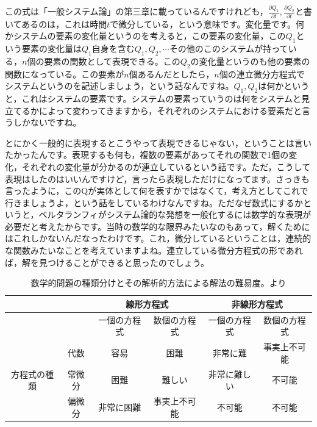 \documentclass{ltjsbook}
\begin{document}
この式は「一般システム論」\parencite{vonBertalanffy}の第三章に載っているんですけれども，$\frac{\partial Q_1}{\partial t},\frac{\partial Q_2}{\partial t}$と書いてあるのは，これは時間$t$で微分している，という意味です。変化量です。何かシステムの要素の変化量というのを考えると，この要素の変化量，この$Q_1$という要素の変化量は$Q_1$自身を含む$Q_1,Q_2,\cdots$その他のこのシステムが持っている，$n$個の要素の関数として表現できる。この$Q_2$の変化量というのも他の要素の関数になっている。この要素が$n$個あるんだとしたら，$n$個の連立微分方程式でシステムというのを記述しましょう，という話なんですね。$Q_1,Q_2$は何かというと，これはシステムの要素です。システムの要素っていうのは何をシステムと見立てるかによって変わってきますから，それぞれのシステムにおける要素だと言うしかないですね。

とにかく一般的に表現するとこうやって表現できるじゃない，ということは言いたかったんです。表現するも何も，複数の要素があってそれの関数で1個の変化，それぞれの変化量が分かるのが連立しているという話です。ただ，こうして表現はしたのはいいんですけど，言ったら表現しただけになってます。さっきも言ったように，このQが実体として何を表すかではなくて，考え方としてこれで行きましょうよ，という話をしているわけなんですね。ただなぜ数式にするかというと，ベルタランフィがシステム論的な発想を一般化するには数学的な表現が必要だと考えたからです。当時の数学的な限界みたいなのもあって，解くためにはこれしかないんだなったわけです。これ，微分しているということは，連続的な関数みたいなことを考えていますよね。連立している微分方程式の形であれば，解を見つけることができると思ったのでしょう。

\begin{table}[h!]
    \centering
    \caption{数学的問題の種類分けとその解析的方法による解法の難易度。\textcite{vonBertalanffy}より}
    \begin{tabular}{|c|c|c|c|c|c|}
        \hline
        & & \multicolumn{2}{c|}{線形方程式} & \multicolumn{2}{c|}{非線形方程式} \\ \hline
        & & 一個の方程式 & 数個の方程式 & 一個の方程式 & 数個の方程式 \\ \hline
        \multirow{3}{*}{方程式の種類} 
        & 代数 & 容易 & 困難 & 非常に難 & 事実上不可能 \\ \cline{2-6}
        & 常微分 & 困難 & 難しい & 非常に難しい & 不可能 \\ \cline{2-6}
        & 偏微分 & 非常に困難 & 事実上不可能 & 不可能 & 不可能 \\ \hline
    \end{tabular}
    \label{tab:math_difficulty}
\end{table}
\end{document}
